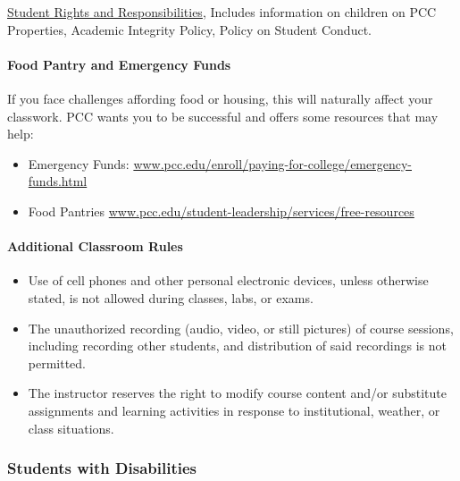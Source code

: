 \documentclass[11pt]{article}
\begin{document}
\href{http://www.pcc.edu/about/policy/student-rights/}{Student Rights
and Responsibilities}, Includes information on children on PCC
Properties, Academic Integrity Policy, Policy on Student Conduct.

\hypertarget{food-pantry-and-emergency-funds}{%
\paragraph{Food Pantry and Emergency
Funds}\label{food-pantry-and-emergency-funds}}

If you face challenges affording food or housing, this will naturally
affect your classwork. PCC wants you to be successful and offers some
resources that may help:

\begin{itemize}
\item
  Emergency Funds:
  \href{https://www.pcc.edu/enroll/paying-for-college/emergency-funds.html}{www.pcc.edu/enroll/paying-for-college/emergency-funds.html}
\item
  Food Pantries
  \href{https://www.pcc.edu/student-leadership/services/free-resources}{www.pcc.edu/student-leadership/services/free-resources}
\end{itemize}

\hypertarget{additional-classroom-rules}{%
\paragraph{Additional Classroom
Rules}\label{additional-classroom-rules}}

\begin{itemize}
\item
  Use of cell phones and other personal electronic devices, unless
  otherwise stated, is not allowed during classes, labs, or exams.
\item
  The unauthorized recording (audio, video, or still pictures) of course
  sessions, including recording other students, and distribution of said
  recordings is not permitted.
\item
  The instructor reserves the right to modify course content and/or
  substitute assignments and learning activities in response to
  institutional, weather, or class situations.
\end{itemize}

    \hypertarget{students-with-disabilities}{%
\subsubsection{Students with
Disabilities}\label{students-with-disabilities}}
\end{document}

